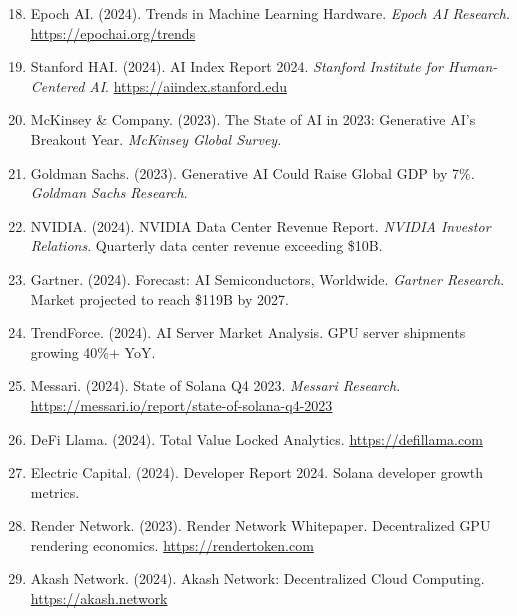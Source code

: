 \documentclass[11pt,a4paper]{article}
\begin{document}
\begin{enumerate}
    \setcounter{enumi}{17}

    \item Epoch AI. (2024). Trends in Machine Learning Hardware. \textit{Epoch AI Research}. \url{https://epochai.org/trends}

    \item Stanford HAI. (2024). AI Index Report 2024. \textit{Stanford Institute for Human-Centered AI}. \url{https://aiindex.stanford.edu}

    \item McKinsey \& Company. (2023). The State of AI in 2023: Generative AI's Breakout Year. \textit{McKinsey Global Survey}.

    \item Goldman Sachs. (2023). Generative AI Could Raise Global GDP by 7\%. \textit{Goldman Sachs Research}.

    \item NVIDIA. (2024). NVIDIA Data Center Revenue Report. \textit{NVIDIA Investor Relations}. Quarterly data center revenue exceeding \$10B.

    \item Gartner. (2024). Forecast: AI Semiconductors, Worldwide. \textit{Gartner Research}. Market projected to reach \$119B by 2027.

    \item TrendForce. (2024). AI Server Market Analysis. GPU server shipments growing 40\%+ YoY.

    \item Messari. (2024). State of Solana Q4 2023. \textit{Messari Research}. \url{https://messari.io/report/state-of-solana-q4-2023}

    \item DeFi Llama. (2024). Total Value Locked Analytics. \url{https://defillama.com}

    \item Electric Capital. (2024). Developer Report 2024. Solana developer growth metrics.

    \item Render Network. (2023). Render Network Whitepaper. Decentralized GPU rendering economics. \url{https://rendertoken.com}

    \item Akash Network. (2024). Akash Network: Decentralized Cloud Computing. \url{https://akash.network}


\end{enumerate}
\end{document}
